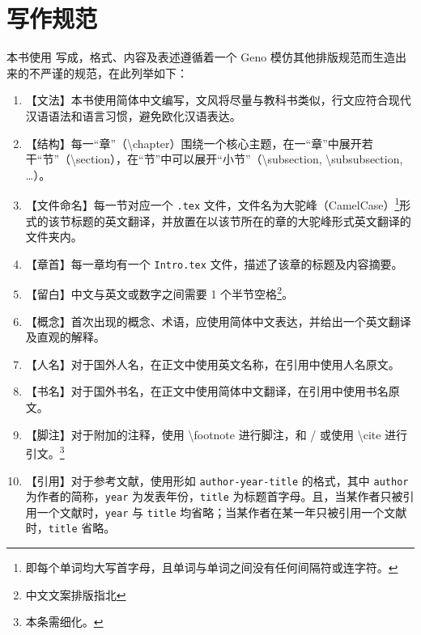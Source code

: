 \chapter*{写作规范}\label{ch:Preface/WritingGuideline}
    本书使用  写成，格式、内容及表述遵循着一个 Geno 模仿其他排版规范而生造出来的不严谨的规范，在此列举如下：

    \begin{enumerate}
        \item 【文法】本书使用简体中文编写，文风将尽量与教科书类似，行文应符合现代汉语语法和语言习惯，避免欧化汉语表达。
        \item 【结构】每一“章”（\textbackslash chapter）围绕一个核心主题，在一“章”中展开若干“节”（\textbackslash section），在“节”中可以展开“小节”（\textbackslash subsection, \textbackslash subsubsection, \ldots）。
        \item 【文件命名】每一节对应一个 \texttt{.tex} 文件，文件名为大驼峰（CamelCase）\footnote{即每个单词均大写首字母，且单词与单词之间没有任何间隔符或连字符。}形式的该节标题的英文翻译，并放置在以该节所在的章的大驼峰形式英文翻译的文件夹内。
        \item 【章首】每一章均有一个 \texttt{Intro.tex} 文件，描述了该章的标题及内容摘要。
        \item 【留白】中文与英文或数字之间需要 1 个半节空格\footnote{中文文案排版指北\cite{sparanoid}}。
        \item 【概念】首次出现的概念、术语，应使用简体中文表达，并给出一个英文翻译及直观的解释。
        \item 【人名】对于国外人名，在正文中使用英文名称，在引用中使用人名原文。
        \item 【书名】对于国外书名，在正文中使用简体中文翻译，在引用中使用书名原文。
        \item 【脚注】对于附加的注释，使用 \textbackslash footnote 进行脚注，和 / 或使用 \textbackslash cite 进行引文。\footnote{本条需细化。}
        \item 【引用】对于参考文献，使用形如 \texttt{author-year-title} 的格式，其中 \texttt{author} 为作者的简称，\texttt{year} 为发表年份，\texttt{title} 为标题首字母。且，当某作者只被引用一个文献时，\texttt{year} 与 \texttt{title} 均省略；当某作者在某一年只被引用一个文献时，\texttt{title} 省略。
    \end{enumerate}
